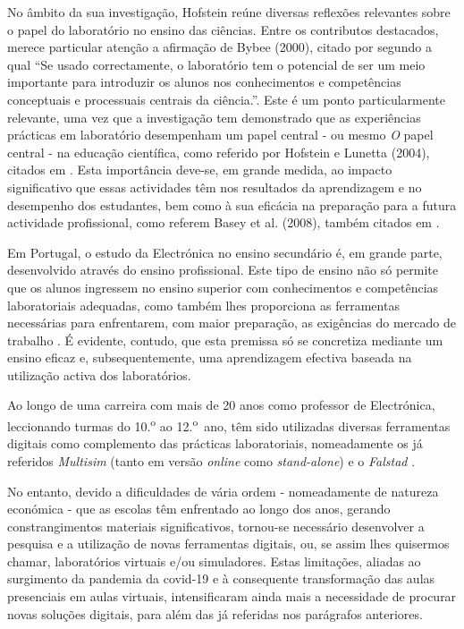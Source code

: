 No âmbito da sua investigação, Hofstein reúne diversas reflexões relevantes sobre o papel do laboratório no ensino das ciências.    
Entre os contributos destacados, merece particular atenção a afirmação de Bybee  (2000), citado por \cite{Hofstein} segundo a qual ``Se usado correctamente, o laboratório tem o potencial de ser um meio importante para introduzir os alunos nos conhecimentos e competências conceptuais e processuais centrais da ciência.''. Este é um ponto particularmente relevante, uma vez que a investigação tem demonstrado que as experiências prácticas em laboratório desempenham um papel central - ou mesmo \textit{O} papel central - na educação científica, como referido por Hofstein e Lunetta (2004), citados em \cite{BRINSON2015218}. Esta importância deve-se, em grande medida, ao impacto significativo que essas actividades têm nos resultados da aprendizagem e no desempenho dos estudantes, bem como à sua eficácia na preparação para a futura actividade profissional, como referem Basey et al. (2008), também citados em \cite{BRINSON2015218}.

Em Portugal, o estudo da Electrónica no ensino secundário é, em grande parte, desenvolvido através do ensino profissional. Este tipo de ensino não só permite que os alunos ingressem no ensino superior com conhecimentos e competências laboratoriais adequadas, como também lhes proporciona as ferramentas necessárias para enfrentarem, com maior preparação, as exigências do mercado de trabalho \cite{anqep}. É evidente, contudo, que esta premissa só se concretiza mediante um ensino eficaz e, subsequentemente, uma aprendizagem efectiva baseada na utilização activa dos laboratórios.

Ao longo de uma carreira com mais de 20 anos como professor de Electrónica, leccionando turmas do 10.\textsuperscript{o} ao 12.\textsuperscript{o}~ano, têm sido utilizadas diversas ferramentas digitais como complemento das prácticas laboratoriais, nomeadamente os já referidos \textit{Multisim} \cite{multisim} (tanto em versão \textit{online} como \textit{stand-alone}) e o \textit{Falstad} \cite{falstad}.

No entanto, devido a dificuldades de vária ordem - nomeadamente de natureza económica - que as escolas têm enfrentado ao longo dos anos, gerando constrangimentos materiais significativos, tornou-se necessário desenvolver a pesquisa e a utilização de novas ferramentas digitais, ou, se assim lhes quisermos chamar, laboratórios virtuais e/ou simuladores. Estas limitações, aliadas ao surgimento da pandemia da \acrshort{covid-19} e à consequente transformação das aulas presenciais em aulas virtuais, intensificaram ainda mais a necessidade de procurar novas soluções digitais, para além das já referidas nos parágrafos anteriores.

